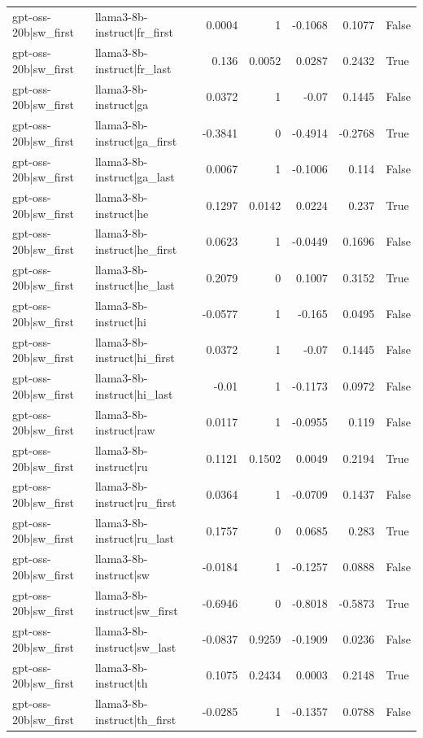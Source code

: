 \begin{table}
\begin{tabular}{l l r r r r l}
gpt-oss-20b|sw_first & llama3-8b-instruct|fr_first & 0.0004 & 1 & -0.1068 & 0.1077 & False \\
gpt-oss-20b|sw_first & llama3-8b-instruct|fr_last & 0.136 & 0.0052 & 0.0287 & 0.2432 & True \\
gpt-oss-20b|sw_first & llama3-8b-instruct|ga & 0.0372 & 1 & -0.07 & 0.1445 & False \\
gpt-oss-20b|sw_first & llama3-8b-instruct|ga_first & -0.3841 & 0 & -0.4914 & -0.2768 & True \\
gpt-oss-20b|sw_first & llama3-8b-instruct|ga_last & 0.0067 & 1 & -0.1006 & 0.114 & False \\
gpt-oss-20b|sw_first & llama3-8b-instruct|he & 0.1297 & 0.0142 & 0.0224 & 0.237 & True \\
gpt-oss-20b|sw_first & llama3-8b-instruct|he_first & 0.0623 & 1 & -0.0449 & 0.1696 & False \\
gpt-oss-20b|sw_first & llama3-8b-instruct|he_last & 0.2079 & 0 & 0.1007 & 0.3152 & True \\
gpt-oss-20b|sw_first & llama3-8b-instruct|hi & -0.0577 & 1 & -0.165 & 0.0495 & False \\
gpt-oss-20b|sw_first & llama3-8b-instruct|hi_first & 0.0372 & 1 & -0.07 & 0.1445 & False \\
gpt-oss-20b|sw_first & llama3-8b-instruct|hi_last & -0.01 & 1 & -0.1173 & 0.0972 & False \\
gpt-oss-20b|sw_first & llama3-8b-instruct|raw & 0.0117 & 1 & -0.0955 & 0.119 & False \\
gpt-oss-20b|sw_first & llama3-8b-instruct|ru & 0.1121 & 0.1502 & 0.0049 & 0.2194 & True \\
gpt-oss-20b|sw_first & llama3-8b-instruct|ru_first & 0.0364 & 1 & -0.0709 & 0.1437 & False \\
gpt-oss-20b|sw_first & llama3-8b-instruct|ru_last & 0.1757 & 0 & 0.0685 & 0.283 & True \\
gpt-oss-20b|sw_first & llama3-8b-instruct|sw & -0.0184 & 1 & -0.1257 & 0.0888 & False \\
gpt-oss-20b|sw_first & llama3-8b-instruct|sw_first & -0.6946 & 0 & -0.8018 & -0.5873 & True \\
gpt-oss-20b|sw_first & llama3-8b-instruct|sw_last & -0.0837 & 0.9259 & -0.1909 & 0.0236 & False \\
gpt-oss-20b|sw_first & llama3-8b-instruct|th & 0.1075 & 0.2434 & 0.0003 & 0.2148 & True \\
gpt-oss-20b|sw_first & llama3-8b-instruct|th_first & -0.0285 & 1 & -0.1357 & 0.0788 & False \\

\end{tabular}
\end{table}
